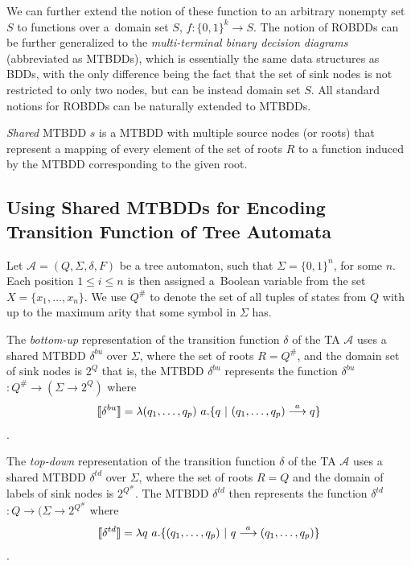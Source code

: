 We can further extend the notion of these function to an arbitrary nonempty set
$S$ to functions over a~domain set $S$, $f : \{0,1\}^k \longrightarrow S$. The
notion of ROBDDs can be further generalized to the \emph{multi-terminal binary
decision diagrams} (abbreviated as MTBDDs), which is essentially the same data
structures as BDDs, with the only difference being the fact that the set of sink
nodes is not restricted to only two nodes, but can be instead domain set $S$.
All standard notions for ROBDDs can be naturally extended to MTBDDs.

\emph{Shared} MTBDD $s$ is a MTBDD with multiple source nodes (or roots) that
represent a mapping of every element of the set of roots $R$ to a function
induced by the MTBDD corresponding to the given root.

\subsection[Usage of MTBDDs with TA]{Using Shared MTBDDs for Encoding
Transition Function of Tree Automata} Let $\mathcal{A} = (Q, \Sigma, \delta, F)$
be a tree automaton, such that $\Sigma = \{0, 1\}^n$, for some $n$. Each
position $1 \leq i \leq n$ is then assigned a~Boolean variable from the set $X =
\{x_1,\ldots,x_n\}$. We use $Q^\#$ to denote the set of all tuples of states from $Q$ with up to the
maximum arity that some symbol in $\Sigma$ has.

The \emph{bottom-up} representation of the transition function $\delta$ of the
TA $\mathcal{A}$ uses a shared MTBDD $\delta^{bu}$ over $\Sigma$, where the set
of roots $R = Q^\#$, and the domain set of sink nodes is $2^Q$ that is, the
MTBDD $\delta^{bu}$ represents the function \textlbrackdbl $\delta^{bu}$
\textrbrackdbl $: Q^\# \rightarrow (\Sigma \rightarrow 2^Q)$ where
 \begin{equation}
  \text{\textlbrackdbl} \delta^{bu} \text{\textrbrackdbl} =
 \lambda (q_1,\ldots,q_p)\ a . \{q\ |\ (q_1,\ldots,q_p)
 \overset{a}{\longrightarrow} q\} \end{equation}.

The \emph{top-down} representation of the transition function $\delta$ of the TA
$\mathcal{A}$ uses a shared MTBDD $\delta^{td}$ over $\Sigma$, where the set of
roots $R = Q$ and the domain of labels of sink nodes is $2^{Q^\#}$. The MTBDD
$\delta^{td}$ then represents the function \textlbrackdbl $\delta^{td}$
\textrbrackdbl $: Q \rightarrow (\Sigma \rightarrow 2^{Q^\#}$ where
\begin{equation} \text{\textlbrackdbl} \delta^{td} \text{\textrbrackdbl} =
\lambda q\ a .
\{(q_1,\ldots,q_p)\ |\ q \overset{a}{\longrightarrow} (q_1,\ldots,q_p)\}
\end{equation}.

